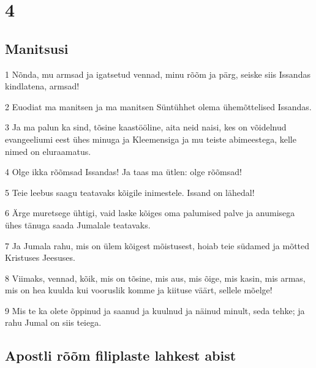 \chapter{4}

\section*{Manitsusi}

\par 1 Nõnda, mu armsad ja igatsetud vennad, minu rõõm ja pärg, seiske siis Issandas kindlatena, armsad!
\par 2 Euodiat ma manitsen ja ma manitsen Süntühhet olema ühemõttelised Issandas.
\par 3 Ja ma palun ka sind, tõsine kaastööline, aita neid naisi, kes on võidelnud evangeeliumi eest ühes minuga ja Kleemensiga ja mu teiste abimeestega, kelle nimed on eluraamatus.
\par 4 Olge ikka rõõmsad Issandas! Ja taas ma ütlen: olge rõõmsad!
\par 5 Teie leebus saagu teatavaks kõigile inimestele. Issand on lähedal!
\par 6 Ärge muretsege ühtigi, vaid laske kõiges oma palumised palve ja anumisega ühes tänuga saada Jumalale teatavaks.
\par 7 Ja Jumala rahu, mis on ülem kõigest mõistusest, hoiab teie südamed ja mõtted Kristuses Jeesuses.
\par 8 Viimaks, vennad, kõik, mis on tõsine, mis aus, mis õige, mis kasin, mis armas, mis on hea kuulda kui vooruslik komme ja kiituse väärt, sellele mõelge!
\par 9 Mis te ka olete õppinud ja saanud ja kuulnud ja näinud minult, seda tehke; ja rahu Jumal on siis teiega.

\section*{Apostli rõõm filiplaste lahkest abist}

